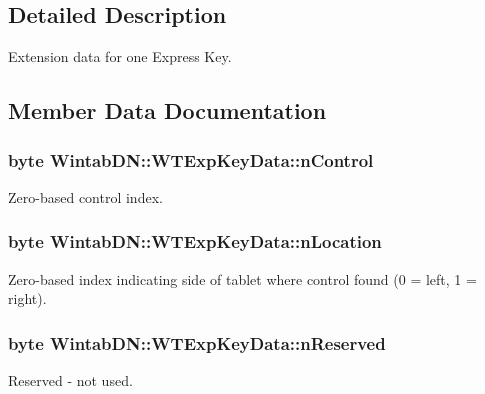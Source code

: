 \subsection{Detailed Description}
Extension data for one Express Key. 

\subsection{Member Data Documentation}
\hypertarget{struct_wintab_d_n_1_1_w_t_exp_key_data_a3517d9dde32f64a3a936a2f4f0ae8fad}{
\subsubsection[{nControl}]{\setlength{\rightskip}{0pt plus 5cm}byte {\bf WintabDN::WTExpKeyData::nControl}}}
\label{struct_wintab_d_n_1_1_w_t_exp_key_data_a3517d9dde32f64a3a936a2f4f0ae8fad}


Zero-\/based control index. 

\hypertarget{struct_wintab_d_n_1_1_w_t_exp_key_data_ab77b69daf1ad64f5e70349072f10ec3a}{
\subsubsection[{nLocation}]{\setlength{\rightskip}{0pt plus 5cm}byte {\bf WintabDN::WTExpKeyData::nLocation}}}
\label{struct_wintab_d_n_1_1_w_t_exp_key_data_ab77b69daf1ad64f5e70349072f10ec3a}


Zero-\/based index indicating side of tablet where control found (0 = left, 1 = right). 

\hypertarget{struct_wintab_d_n_1_1_w_t_exp_key_data_af8ece8d7a372d170113016896b92b0fd}{
\subsubsection[{nReserved}]{\setlength{\rightskip}{0pt plus 5cm}byte {\bf WintabDN::WTExpKeyData::nReserved}}}
\label{struct_wintab_d_n_1_1_w_t_exp_key_data_af8ece8d7a372d170113016896b92b0fd}


Reserved -\/ not used. 

